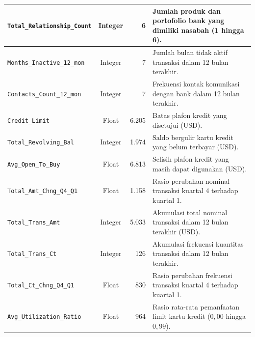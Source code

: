 \documentclass[a4paper,oneside,12pt]{report}
\begin{document}
\begin{table}[H]
\begin{tabularx}{\linewidth}{|l|c|r|>{\raggedright\arraybackslash}X|}
			\hline
		\texttt{Total\_Relationship\_Count} & Integer            & 6             & Jumlah produk dan portofolio bank yang dimiliki nasabah (1 hingga 6).                   \\
			\hline
		\texttt{Months\_Inactive\_12\_mon}  & Integer            & 7             & Jumlah bulan tidak aktif transaksi dalam 12 bulan terakhir.                             \\
			\hline
		\texttt{Contacts\_Count\_12\_mon}   & Integer            & 7             & Frekuensi kontak komunikasi dengan bank dalam 12 bulan terakhir.                        \\
			\hline
		\texttt{Credit\_Limit}              & Float              & 6.205         & Batas plafon kredit yang disetujui (USD).                                               \\
			\hline
		\texttt{Total\_Revolving\_Bal}      & Integer            & 1.974         & Saldo bergulir kartu kredit yang belum terbayar (USD).                                  \\
			\hline
		\texttt{Avg\_Open\_To\_Buy}         & Float              & 6.813         & Selisih plafon kredit yang masih dapat digunakan (USD).                                 \\
			\hline
		\texttt{Total\_Amt\_Chng\_Q4\_Q1}   & Float              & 1.158         & Rasio perubahan nominal transaksi kuartal 4 terhadap kuartal 1.                         \\
			\hline
		\texttt{Total\_Trans\_Amt}          & Integer            & 5.033         & Akumulasi total nominal transaksi dalam 12 bulan terakhir (USD).                        \\
			\hline
		\texttt{Total\_Trans\_Ct}           & Integer            & 126           & Akumulasi frekuensi kuantitas transaksi dalam 12 bulan terakhir.                        \\
			\hline
		\texttt{Total\_Ct\_Chng\_Q4\_Q1}    & Float              & 830           & Rasio perubahan frekuensi transaksi kuartal 4 terhadap kuartal 1.                       \\
			\hline
		\texttt{Avg\_Utilization\_Ratio}    & Float              & 964           & Rasio rata-rata pemanfaatan limit kartu kredit ($0,00$ hingga $0,99$).                  \\
		\hline
	\end{tabularx}
\end{table}
\end{document}
